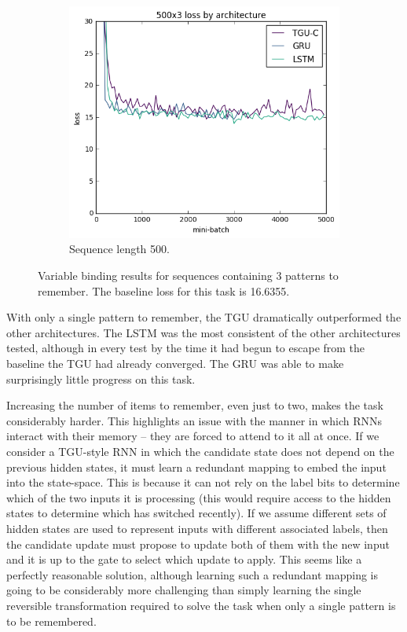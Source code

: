 \begin{figure}[htb]
\begin{subfigure}[t]{0.3\linewidth}
	\includegraphics[width=\linewidth]{exps/vbind/plots/500x3}
	\caption{Sequence length 500.}
\end{subfigure}

\caption[Variable binding results, three patterns]
{Variable binding results for sequences containing \(3\) patterns to remember. The baseline loss for this
task is 16.6355.}
\label{fig:vbindn3}
\end{figure}

With only a single pattern to remember, the TGU dramatically outperformed the other
architectures. The LSTM was the most consistent of the other architectures tested,
although in every test by the time it had begun to escape from the baseline the TGU
had already converged. The GRU was able to make surprisingly little progress on this
task.

Increasing the number of items to remember, even just to two, makes the
task considerably harder. This highlights an issue with the manner
in which RNNs interact with their memory -- they are forced to attend to it all
at once. If we consider a TGU-style RNN in which the candidate state does not
depend on the previous hidden states, it must learn a redundant mapping to embed
the input into the state-space. This is because it can not rely on the label
bits to determine which of the two inputs it is processing (this would require
access to the hidden states to determine which has switched recently). If we
assume different sets of hidden states are used to represent inputs with different
associated labels, then the candidate update must propose to update both of them
with the new input and it is up to the gate to select which update to apply.
This seems like a perfectly reasonable solution, although learning such a redundant
mapping is going to be considerably more challenging than simply learning the single
reversible transformation required to solve the task when only a single pattern
is to be remembered.

